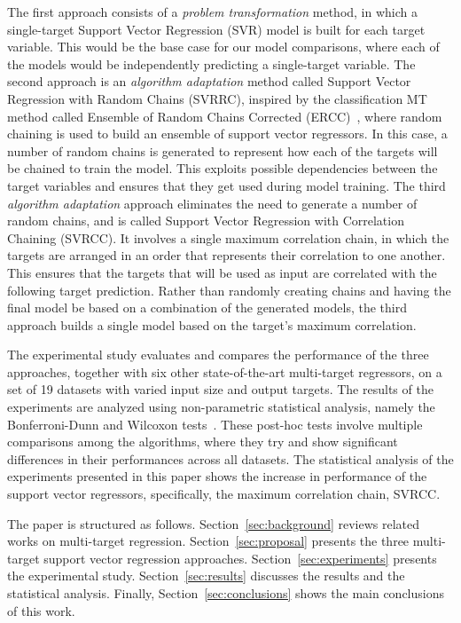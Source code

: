 \documentclass[preprint,12pt]{elsarticle}
\begin{document}
The first approach consists of a \textit{problem transformation} method, in which a single-target Support Vector Regression (SVR) model is built for each target variable. This would be the base case for our model comparisons, where each of the models would be independently predicting a single-target variable. The second approach is an \textit{algorithm adaptation} method called Support Vector Regression with Random Chains (SVRRC), inspired by the classification MT method called Ensemble of Random Chains Corrected (ERCC)~\cite{Xiong2014}, where random chaining is used to build an ensemble of support vector regressors. In this case, a number of random chains is generated to represent how each of the targets will be chained to train the model. This exploits possible dependencies between the target variables and ensures that they get used during model training. The third \textit{algorithm adaptation} approach eliminates the need to generate a number of random chains, and is called Support Vector Regression with Correlation Chaining (SVRCC). It involves a single maximum correlation chain, in which the targets are arranged in an order that represents their correlation to one another. This ensures that the targets that will be used as input are correlated with the following target prediction. Rather than randomly creating chains and having the final model be based on a combination of the generated models, the third approach builds a single model based on the target's maximum correlation. 

The experimental study evaluates and compares the performance of the three approaches, together with six other state-of-the-art multi-target regressors, on a set of 19 datasets with varied input size and output targets. The results of the experiments are analyzed using non-parametric statistical analysis, namely the Bonferroni-Dunn and Wilcoxon tests~\cite{Garcia20102044}. These post-hoc tests involve multiple comparisons among the algorithms, where they try and show significant differences in their performances across all datasets. The statistical analysis of the experiments presented in this paper shows the increase in performance of the support vector regressors, specifically, the maximum correlation chain, SVRCC.

The paper is structured as follows. Section~\ref{sec:background} reviews related works on multi-target regression. Section~\ref{sec:proposal} presents the three multi-target support vector regression approaches. Section~\ref{sec:experiments} presents the experimental study. Section~\ref{sec:results} discusses the results and the statistical analysis. Finally, Section~\ref{sec:conclusions} shows the main conclusions of this work.
\end{document}
